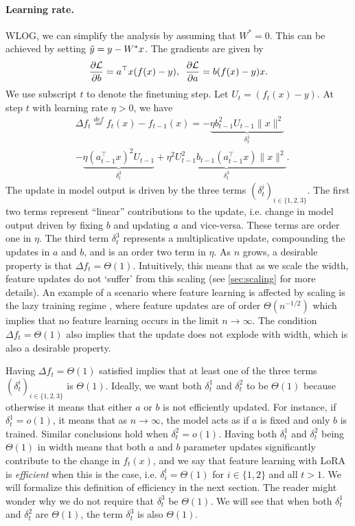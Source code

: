 \paragraph{Learning rate.} WLOG, we can simplify the analysis by assuming that $W^* = 0$. This can be achieved by setting $\Tilde{y} = y - W^* x$. The gradients are given by
\begin{align*}
\frac{\partial\mathcal{L}}{\partial b} =a^{\top}x(f(x)-y), \,\,\,
\frac{\partial\mathcal{L}}{\partial a}  =b(f(x)-y)x.
\end{align*}
 We use subscript $t$ to denote the finetuning step. Let $U_t = (f_t(x)-y)$. At step $t$ with learning rate $\eta>0$, we have 
\begin{align*}
&\Delta f_t \overset{def}{=} f_t(x) - f_{t-1}(x) = -\underset{\delta_t^1}{\underbrace{\eta b_{t-1}^{2}U_{t-1}\|x\|^{2}}}\\
&-\underset{\delta_t^2}{\underbrace{\eta(a_{t-1}^{\top}x)^{2}U_{t-1}}}+\underset{\delta_t^3}{\underbrace{\eta^2 U_{t-1}^{2}b_{t-1}(a_{t-1}^{\top}x)\|x\|^{2}}}.
\end{align*}
The update in model output is driven by the three terms $(\delta_t^i)_{i \in \{1,2,3\}}$. The first two terms represent ``linear'' contributions to the update, i.e. change in model output driven by fixing $b$ and updating $a$ and vice-versa. These terms are order one in $\eta$. The third term $\delta_t^3$ represents a multiplicative update, compounding the updates in $a$ and $b$, and is an order two term in $\eta$. As $n$ grows, a desirable property is that $\Delta f_t=\Theta(1)$. Intuitively, this means that as we scale the width, feature updates do not `suffer' from this scaling (see \cref{sec:scaling} for more details). An example of a scenario where feature learning is affected by scaling is the lazy training regime \citep{jacot2018neural}, where feature updates are of order $\Theta(n^{-1/2})$ which implies that no feature learning occurs in the limit $n \to \infty$. The condition $\Delta f_t = \Theta(1)$ also implies that the update does not explode with width, which is also a desirable property. 

Having $\Delta f_t = \Theta(1)$ satisfied implies that at least one of the three terms $(\delta_t^i)_{i \in \{1,2,3\}}$ is $\Theta(1)$. Ideally, we want both $\delta^1_t$ and $\delta^2_t$ to be $\Theta(1)$ because otherwise it means that either $a$ or $b$ is not efficiently updated. For instance, if $\delta^1_t = o(1)$, it means that as $n \to \infty$, the model acts as if $a$ is fixed and only $b$ is trained. Similar conclusions hold when $\delta^2_t = o(1)$. Having both $\delta^1_t$ and $\delta^2_t$ being $\Theta(1)$ in width means that both $a$ and $b$ parameter updates significantly contribute to the change in $f_t(x)$, and we say that feature learning with LoRA is \emph{efficient} when this is the case, i.e. $\delta_i^t = \Theta(1)$ for $i \in \{1,2\}$ and all $t>1$. We will formalize this definition of efficiency in the next section. The reader might wonder why we do not require that $\delta^3_t$ be $\Theta(1)$. We will see that when both $\delta^1_t$ and $\delta^2_t$ are $\Theta(1)$, the term $\delta^3_t$ is also $\Theta(1)$.

